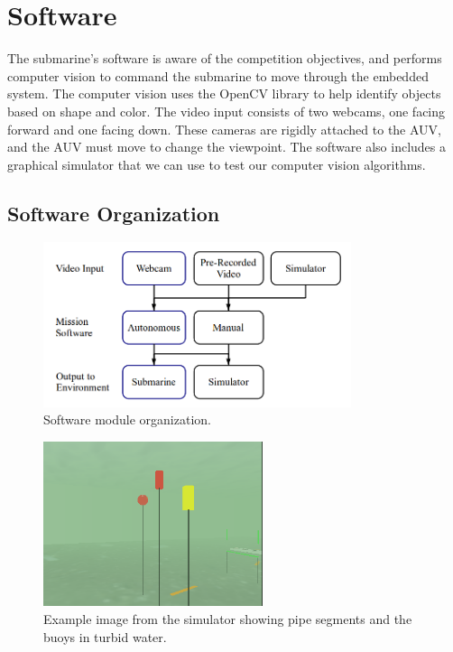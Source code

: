 \section{Software}

The submarine's software is aware of the competition objectives, and performs computer vision to
command the submarine to move through the embedded system.
The computer vision uses the OpenCV library to help identify objects based on shape and color.
The video input consists of two webcams, one facing forward and one facing down.
These cameras are rigidly attached to the AUV, and the AUV must move to change the viewpoint.
The software also includes a graphical simulator that we can use to test our computer vision algorithms.

\subsection{Software Organization}
\label{gui}


\begin{figure}
\begin{center}
 \includegraphics[height=1.9in]{fig/modules.png}
\caption{Software module organization.}\label{vision}
\end{center}
\end{figure}


\begin{figure}
\begin{center}
 \includegraphics[height=1.9in]{fig/sim.png}
\caption{Example image from the simulator showing pipe segments and the buoys
         in turbid water.}\label{sim}
\end{center}
\end{figure}

